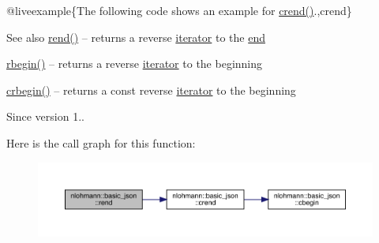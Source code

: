 @liveexample\{The following code shows an example for {\ttfamily \mbox{\hyperlink{classnlohmann_1_1basic__json_a5795b029dbf28e0cb2c7a439ec5d0a88}{crend()}}}.,crend\}

\begin{DoxySeeAlso}{See also}
\mbox{\hyperlink{classnlohmann_1_1basic__json_ac77aed0925d447744676725ab0b6d535}{rend()}} -- returns a reverse \mbox{\hyperlink{classnlohmann_1_1basic__json_a099316232c76c034030a38faa6e34dca}{iterator}} to the \mbox{\hyperlink{classnlohmann_1_1basic__json_a13e032a02a7fd8a93fdddc2fcbc4763c}{end}} 

\mbox{\hyperlink{classnlohmann_1_1basic__json_a1ef93e2006dbe52667294f5ef38b0b10}{rbegin()}} -- returns a reverse \mbox{\hyperlink{classnlohmann_1_1basic__json_a099316232c76c034030a38faa6e34dca}{iterator}} to the beginning 

\mbox{\hyperlink{classnlohmann_1_1basic__json_a1e0769d22d54573f294da0e5c6abc9de}{crbegin()}} -- returns a const reverse \mbox{\hyperlink{classnlohmann_1_1basic__json_a099316232c76c034030a38faa6e34dca}{iterator}} to the beginning
\end{DoxySeeAlso}
\begin{DoxySince}{Since}
version 1.. 
\end{DoxySince}
Here is the call graph for this function\+:\nopagebreak
\begin{figure}[H]
\begin{center}
\leavevmode
\includegraphics[width=350pt]{classnlohmann_1_1basic__json_a4f73d4cee67ea328d785979c22af0ae1_cgraph}
\end{center}
\end{figure}
\mbox{\label{classnlohmann_1_1basic__json_a25e27ad0c6d53c01871c5485e1f75b96}} 
